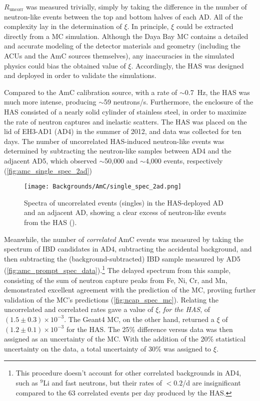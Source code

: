 \documentclass[../thesis.tex]{subfiles}
\begin{document}
$R_{\mathrm{uncorr}}$ was measured trivially, simply by taking the difference in the number of neutron-like events between the top and bottom halves of each AD. All of the complexity lay in the determination of $\xi$. In principle, $\xi$ could be extracted directly from a MC simulation. Although the Daya Bay MC contains a detailed and accurate modeling of the detector materials and geometry (including the ACUs and the AmC sources themselves), any inaccuracies in the simulated physics could bias the obtained value of $\xi$. Accordingly, the HAS was designed and deployed in order to validate the simulations.

Compared to the AmC calibration source, with a rate of $\sim$0.7~Hz, the HAS was much more intense, producing $\sim$59 neutrons/s. Furthermore, the enclosure of the HAS consisted of a nearly solid cylinder of stainless steel, in order to maximize the rate of neutron captures and inelastic scatters. The HAS was placed on the lid of EH3-AD1 (AD4) in the summer of 2012, and data was collected for ten days. The number of uncorrelated HAS-induced neutron-like events was determined by subtracting the neutron-like samples between AD4 and the adjacent AD5, which observed $\sim$50,000 and $\sim$4,000 events, respectively (\autoref{fig:amc_single_spec_2ad})

\begin{figure}[ht]
  \texttt{[image: Backgrounds/AmC/single\_spec\_2ad.png]}
  \caption{Spectra of uncorrelated events (singles) in the HAS-deployed AD and an adjacent AD, showing a clear excess of neutron-like events from the HAS (\cite{Gu_2016}).}
  \label{fig:amc_single_spec_2ad}
\end{figure}

Meanwhile, the number of \emph{correlated} AmC events was measured by taking the spectrum of IBD candidates in AD4, subtracting the accidental background, and then subtracting the (background-subtracted) IBD sample measured by AD5 (\autoref{fig:amc_prompt_spec_data}).\footnote{This procedure doesn't account for other correlated backgrounds in AD4, such as $^9$Li and fast neutrons, but their rates of $< 0.2$/d are insignificant compared to the 63 correlated events per day produced by the HAS.} The delayed spectrum from this sample, consisting of the sum of neutron capture peaks from Fe, Ni, Cr, and Mn, demonstrated excellent agreement with the prediction of the MC, proviing further validation of the MC's predictions (\autoref{fig:ncap_spec_mc}). Relating the uncorrelated and correlated rates gave a value of $\xi$, \emph{for the HAS}, of $(1.5\pm0.3)\times10^{-3}$. The Geant4 MC, on the other hand, returned a $\xi$ of $(1.2\pm0.1)\times10^{-3}$ for the HAS. The 25\% difference versus data was then assigned as an uncertainty of the MC. With the addition of the 20\% statistical uncertainty on the data, a total uncertainty of 30\% was assigned to $\xi$.
\end{document}
